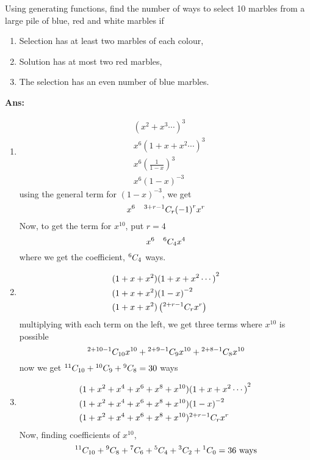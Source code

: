 \begin{example}
    Using generating functions, find the number of ways to select 10 marbles from a large pile of blue, red and white marbles if
    \begin{enumerate}
        \item Selection has at least two marbles of each colour,
        \item Solution has at most two red marbles,
        \item The selection has an even number of blue marbles.
    \end{enumerate}

    \textbf{Ans:} \begin{enumerate}
        \item \begin{align*}
                   & {(x^2+x^3\cdots)}^3                \\
                   & x^6 {(1+x+x^2\cdots)}^3            \\
                   & x^6 {\left(\frac{1}{1-x}\right)}^3 \\
                   & x^6 {(1-x)}^{-3}
              \end{align*}
              using the general term for \mbox{${(1-x)}^{-3}$}, we get
              \[
                  x^6\quad {}^{3+r-1}C_{r} {(-1)}^r x^r
              \]
              Now, to get the term for \mbox{$x^{10}$}, put \mbox{$r=4$}
              \[
                  x^6\quad{}^{6}C_{4} x^4
              \]
              where we get the coefficient, \mbox{${}^{6}C_{4}$} ways.

        \item \begin{align*}
                   & (1+x+x^2){(1+x+x^2\cdots)}^2             \\
                   & (1+x+x^2){(1-x)}^{-2}                    \\
                   & (1+x+x^2)\left({}^{2+r-1}C_{r}x^r\right)
              \end{align*}
              multiplying with each term on the left, we get three terms where \mbox{$x^{10}$} is possible
              \[
                  {}^{2+10-1}C_{10}x^{10} + {}^{2+9-1}C_{9}x^{10} + {}^{2+8-1}C_{8}x^{10}
              \]
              now we get \mbox{${}^{11}C_{10} + {}^{10}C_{9}+ {}^{9}C_{8} = 30$} ways

        \item \begin{align*}
                   & (1+x^2+x^4+x^6+x^8+x^{10}){(1+x+x^2\cdots)}^2\, \\
                   & (1+x^2+x^4+x^6+x^8+x^{10}){(1-x)}^{-2}          \\
                   & (1+x^2+x^4+x^6+x^8+x^{10}){}^{2+r-1}C_{r}x^r\,  \\
              \end{align*}
              Now, finding coefficients of \mbox{$x^{10}$},
              \[
                  {}^{11}C_{10} + {}^{9}C_{8} + {}^{7}C_{6} +{}^{5}C_{4} + {}^{3}C_{2} + {}^{1}C_{0} = 36 \text{ ways}
              \]
    \end{enumerate}
\end{example}

